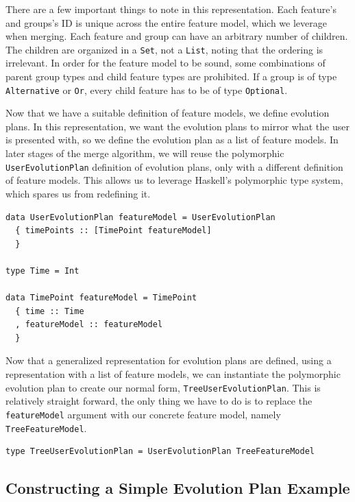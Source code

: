 \documentclass[a4paper,english]{ifimaster}
\begin{document}
There are a few important things to note in this representation. Each feature's and groups's ID is unique across the entire feature model, which we leverage when merging. Each feature and group can have an arbitrary number of children. The children are organized in a \texttt{Set}, not a \texttt{List}, noting that the ordering is irrelevant. In order for the feature model to be sound, some combinations of parent group types and child feature types are prohibited. If a group is of type \texttt{Alternative} or \texttt{Or}, every child feature has to be of type \texttt{Optional}.

Now that we have a suitable definition of feature models, we define evolution plans. In this representation, we want the evolution plans to mirror what the user is presented with, so we define the evolution plan as a list of feature models. In later stages of the merge algorithm, we will reuse the polymorphic \texttt{User\-Evolution\-Plan} definition of evolution plans, only with a different definition of feature models. This allows us to leverage Haskell's polymorphic type system, which spares us from redefining it.

\begin{verbatim}
data UserEvolutionPlan featureModel = UserEvolutionPlan
  { timePoints :: [TimePoint featureModel]
  }

type Time = Int

data TimePoint featureModel = TimePoint
  { time :: Time
  , featureModel :: featureModel
  }
\end{verbatim}

Now that a generalized representation for evolution plans are defined, using a representation with a list of feature models, we can instantiate the polymorphic evolution plan to create our normal form, \texttt{Tree\-User\-Evolution\-Plan}. This is relatively straight forward, the only thing we have to do is to replace the \texttt{featureModel} argument with our concrete feature model, namely \texttt{Tree\-Feature\-Model}.

\begin{verbatim}
type TreeUserEvolutionPlan = UserEvolutionPlan TreeFeatureModel
\end{verbatim}

\subsection{Constructing a Simple Evolution Plan Example}%
\label{sub:constructing_a_simple_evolution_plan_example}
\end{document}
